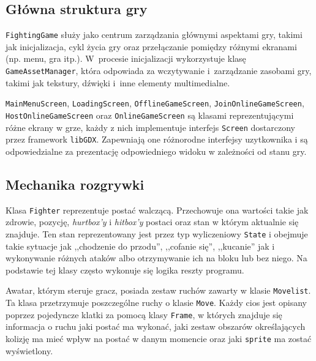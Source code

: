 \subsection{Główna struktura gry}
\texttt{FightingGame} służy jako centrum zarządzania głównymi aspektami gry, takimi jak inicjalizacja, cykl życia gry oraz przełączanie pomiędzy różnymi ekranami (np. menu, gra itp.). W~procesie inicjalizacji wykorzystuje klasę \texttt{GameAssetManager}, która odpowiada za wczytywanie i~zarządzanie zasobami gry, takimi jak tekstury, dźwięki i~inne elementy multimedialne.

\texttt{MainMenuScreen}, \texttt{LoadingScreen}, \texttt{OfflineGameScreen}, \texttt{JoinOnlineGameScreen}, \texttt{HostOnlineGameScreen} oraz \texttt{OnlineGameScreen} są klasami reprezentującymi różne ekrany w grze, każdy z nich implementuje interfejs \texttt{Screen} dostarczony przez framework \texttt{libGDX}. Zapewniają one różnorodne interfejsy uzytkownika i są odpowiedzialne za prezentację odpowiedniego widoku w zależności od stanu gry.

\subsection{Mechanika rozgrywki}
Klasa \texttt{Fighter} reprezentuje postać walczącą. Przechowuje ona wartości takie jak zdrowie, pozycję, \emph{hurtbox'y} i \emph{hitbox'y} postaci oraz stan w którym aktualnie się znajduje. Ten stan reprezentowany jest przez typ wyliczeniowy \texttt{State} i obejmuje takie sytuacje jak ,,chodzenie do przodu'', ,,cofanie się'', ,,kucanie'' jak i wykonywanie różnych ataków albo otrzymywanie ich na bloku lub bez niego. Na podstawie tej klasy często wykonuje się logika reszty programu. 

Awatar, którym steruje gracz, posiada zestaw ruchów zawarty w klasie \texttt{Movelist}. Ta klasa przetrzymuje poszczególne ruchy o klasie \texttt{Move}. Każdy cios jest opisany poprzez pojedyncze klatki za pomocą klasy \texttt{Frame}, w których znajduje się informacja o ruchu jaki postać ma wykonać, jaki zestaw obszarów określających kolizję ma mieć wpływ na postać w danym momencie oraz jaki \texttt{sprite} ma zostać wyświetlony.

